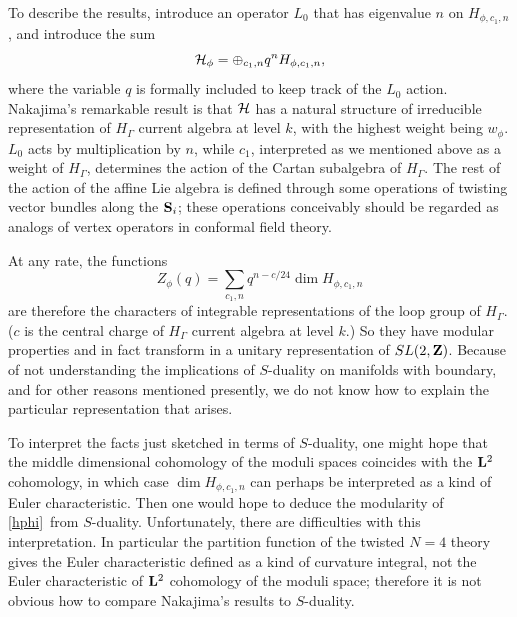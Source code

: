 \documentclass[12pt]{article}
\numberwithin{equation}{section}
\begin{document}
To describe  the results, introduce an operator
$L_0$ that has eigenvalue $n$ on $H_{\phi,c_1,n}$, and introduce the
sum
\begin{equation}
  {\cal H}_\phi=\oplus_{c_1,n}q^n H_{\phi,c_1,n},
\end{equation}
where the variable $q$ is formally included to keep track of the
$L_0$ action.  Nakajima's remarkable result is that ${\cal H}$
has a natural structure of irreducible representation of $H_\Gamma$
current algebra at level $k$, with the highest weight being $w_\phi$.
$L_0$ acts by multiplication by $n$, while $c_1$, interpreted as we mentioned
above as a weight of $H_\Gamma$, determines the action of the Cartan
subalgebra of $H_\Gamma$. The rest of the
action of the affine Lie algebra is defined through
some operations of twisting vector bundles along the ${\bf S}_i$;
these operations conceivably should be regarded as
analogs of vertex operators in conformal field
theory.

At any rate, the functions
\begin{equation}
  \label{hphi}
  Z_\phi(q)=\sum_{c_1,n}q^{n-c/24} \dim H_{\phi,c_1,n}
\end{equation}
are therefore the characters of integrable representations of the loop
group of $H_\Gamma$.  ($c$ is the central charge of $H_\Gamma$ current
algebra at level $k$.)   So they
have modular properties and in fact transform in a unitary representation
of $SL(2,{\bf Z})$.  Because of not understanding the implications
of $S$-duality on manifolds with boundary, and for other reasons
mentioned presently, we do not know how to explain the particular
representation that arises.

To interpret the facts just sketched  in terms of $S$-duality,
one might hope that the middle dimensional cohomology of the moduli
spaces coincides with the ${\bf L}^2$ cohomology, in which case
$\dim H_{\phi,c_1,n}$ can perhaps be
interpreted as a kind of Euler characteristic.
Then one would hope to deduce the modularity of \eqref{hphi}\ from
$S$-duality.
Unfortunately, there are difficulties with this interpretation.
In particular the partition function of the twisted $N=4$
theory gives the Euler characteristic defined as a kind of curvature
integral, not the Euler characteristic of ${\bf L}^2$ cohomology of the
moduli space; therefore it is not obvious
how to compare Nakajima's results to $S$-duality.
\end{document}
